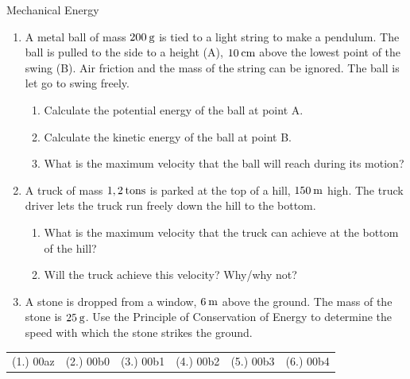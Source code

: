 \begin{eocexercises}{Mechanical Energy}
\begin{enumerate}[noitemsep, label=\textbf{\arabic*}. ]
\label{m38786*id71971}\begin{enumerate}[noitemsep, label=\textbf{\alph*}. ] 
            \label{m38786*uid133}\item What is the maximum height that the rock will reach?
\label{m38786*uid134}\item Draw graphs to show how the potential energy, kinetic energy and mechanical energy of the rock changes as it moves to its highest point.
\end{enumerate}
                  \label{m38786*uid135}\item A metal ball of mass $200\phantom{\rule{2pt}{0ex}}\text{g}$ is tied to a light string to make a pendulum. The ball is pulled to the side to a height (A), $10\phantom{\rule{2pt}{0ex}}\text{cm}$ above the lowest point of the swing (B). Air friction and the mass of the string can be ignored. The ball is let go to swing freely.
\label{m38786*id72026}\begin{enumerate}[noitemsep, label=\textbf{\alph*}. ] 
            \label{m38786*uid136}\item Calculate the potential energy of the ball at point A.
\label{m38786*uid137}\item Calculate the kinetic energy of the ball at point B.
\label{m38786*uid138}\item What is the maximum velocity that the ball will reach during its motion?
\end{enumerate}
                \label{m38786*uid139}\item A truck of mass $1,2\phantom{\rule{2pt}{0ex}}\text{tons}$ is parked at the top of a hill, $150\phantom{\rule{2pt}{0ex}}\text{m}$ high. The truck driver lets the truck run freely down the hill to the bottom.
\label{m38786*id72082}\begin{enumerate}[noitemsep, label=\textbf{\alph*}. ] 
            \label{m38786*uid140}\item What is the maximum velocity that the truck can achieve at the bottom of the hill?
\label{m38786*uid141}\item Will the truck achieve this velocity? Why/why not?
\end{enumerate}
                \label{m38786*uid142}\item A stone is dropped from a window, $6\phantom{\rule{2pt}{0ex}}\text{m}$ above the ground. The mass of the stone is $25\phantom{\rule{2pt}{0ex}}\text{g}$.
Use the Principle of Conservation of Energy to determine the speed with which the stone strikes the ground.
           \end{enumerate}
  \label{m38786**end}
  \label{1fc5ba69690764517c30802fdf7b1905**end}
\par \practiceinfo
 \par \begin{tabular}[h]{cccccc}
 (1.) 00az  &  (2.) 00b0  &  (3.) 00b1  &  (4.) 00b2  &  (5.) 00b3  &  (6.) 00b4  & \end{tabular}
\end{eocexercises}
